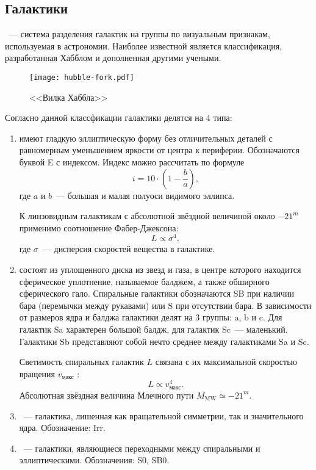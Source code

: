 \subsection{Галактики}
~--- система разделения галактик на группы по визуальным признакам, используемая в астрономии. Наиболее известной является классификация, разработанная Хабблом и дополненная другими учеными. 
	\begin{figure}[h!]
		\centering
		\vspace{-.9pc}
		\texttt{[image: hubble-fork.pdf]}
		\caption{<<Вилка Хаббла>>}
	\end{figure}
	
Согласно данной классфикации галактики делятся на 4 типа:
\begin{enumerate}[itemsep=3pt, label={\arabic*.}, leftmargin=1pc]
	\item{ имеют гладкую эллиптическую форму без отличительных деталей с равномерным уменьшением яркости от центра к периферии. Обозначаются буквой E с индексом. Индекс можно рассчитать по формуле
		\begin{equation}
		i = 10 \cdot \left(1 - \frac{b}{a}\right),
		\end{equation}\nopagebreak
		где $a$ и $b$~--- большая и малая полуоси видимого эллипса. 
		
		К линзовидным галактикам с абсолютной звёздной величиной около $-21^m$ применимо соотношение Фабер-Джексона:
		\begin{equation}
			L \propto \sigma^4,
		\end{equation}
		где $\sigma$~--- дисперсия скоростей вещества в галактике.}
	\item{ состоят из уплощенного диска из звезд и газа, в центре которого находится сферическое уплотнение, называемое балджем, а также обширного сферического гало. Спиральные галактики обозначаются SB при наличии бара (перемычки между рукавами) или S при отсутствии бара. В зависимости от размеров ядра и балджа галактики делят на 3 группы: a, b и c. Для галактик Sa характерен большой балдж, для галактик Sc~--- маленький. Галактики Sb представляют собой нечто среднее между галактиками Sa и Sc.
	
	Светимость спиральных галактик $L$ связана с их максимальной скоростью вращения $v_\text{макс}$ :
	\begin{equation}
		L \propto v_\text{макс}^4.
	\end{equation}
	Абсолютная звёздная величина Млечного пути $M_\text{MW} \simeq -21^m$.}
	\item{~--- галактика, лишенная как вращательной симметрии, так и значительного ядра. Обозначение: Irr.}
	\item{~--- галактики, являющиеся переходными между спиральными и эллиптическими. Обозначения: S0, SB0.}
\end{enumerate}

